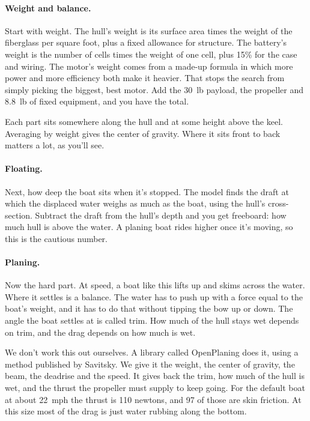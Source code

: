 \documentclass[11pt,a4paper]{article}
\renewcommand{\_}{\textunderscore\allowbreak}
\begin{document}
\paragraph{Weight and balance.} Start with weight. The hull's weight is its surface area times the weight of the fiberglass per square foot, plus a fixed allowance for structure.
The battery's weight is the number of cells times the weight of one cell, plus 15\% for the case and wiring. The motor's weight comes from a made-up formula in which more power and
more efficiency both make it heavier. That stops the search from simply picking the biggest, best motor. Add the 30~lb payload, the propeller and 8.8~lb of fixed equipment,
and you have the total.

Each part sits somewhere along the hull and at some height above the keel. Averaging by weight gives the center of gravity. Where it sits front to back matters a lot, as you'll see.

\paragraph{Floating.} Next, how deep the boat sits when it's stopped. The model finds the draft at which the displaced water weighs as much as the boat, using the hull's cross-section.
Subtract the draft from the hull's depth and you get freeboard: how much hull is above the water. A planing boat rides higher once it's moving, so this is the cautious number.

\paragraph{Planing.} Now the hard part. At speed, a boat like this lifts up and skims across the water. Where it settles is a balance. The water has to push up with a force equal to the boat's weight,
and it has to do that without tipping the bow up or down. The angle the boat settles at is called trim. How much of the hull stays wet depends on trim, and the drag depends on how much is wet.

We don't work this out ourselves. A library called OpenPlaning does it, using a method published by Savitsky. We give it the weight, the center of gravity, the beam, the deadrise and the speed.
It gives back the trim, how much of the hull is wet, and the thrust the propeller must supply to keep going. For the default boat at about 22~mph the thrust is 110 newtons, and 97 of those are skin friction.
At this size most of the drag is just water rubbing along the bottom.
\end{document}
